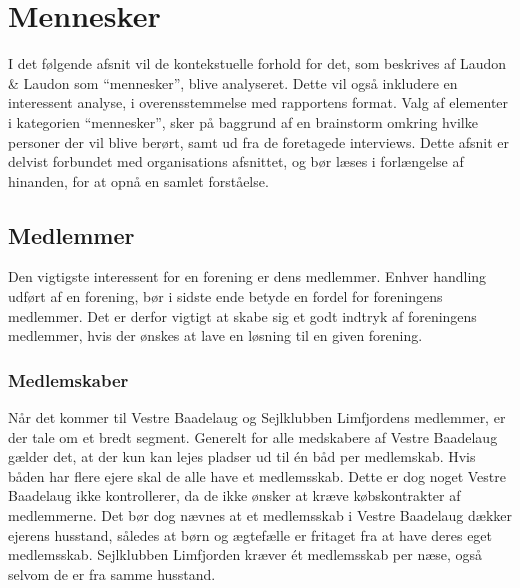 







\section{Mennesker}

I det følgende afsnit vil de kontekstuelle forhold for det, som beskrives af Laudon \& Laudon som \enquote{mennesker}, blive analyseret. Dette vil også inkludere en interessent analyse, i overensstemmelse med rapportens format. Valg af elementer i kategorien \enquote{mennesker}, sker på baggrund af en brainstorm omkring hvilke personer der vil blive berørt, samt ud fra de foretagede interviews. Dette afsnit er delvist forbundet med organisations afsnittet, og bør læses i forlængelse af hinanden, for at opnå en samlet forståelse.

\subsection{Medlemmer}

Den vigtigste interessent for en forening er dens medlemmer. Enhver handling udført af en forening, bør i sidste ende betyde en fordel for foreningens medlemmer. Det er derfor vigtigt at skabe sig et godt indtryk af foreningens medlemmer, hvis der ønskes at lave en løsning til en given forening.


\subsubsection{Medlemskaber}

Når det kommer til Vestre Baadelaug og Sejlklubben Limfjordens medlemmer, er der tale om et bredt segment. Generelt for alle medskabere af Vestre Baadelaug gælder det, at der kun kan lejes pladser ud til én båd per medlemskab. Hvis båden har flere ejere skal de alle have et medlemsskab. Dette er dog noget Vestre Baadelaug ikke kontrollerer, da de ikke ønsker at kræve købskontrakter af medlemmerne. Det bør dog nævnes at et medlemsskab i Vestre Baadelaug dækker ejerens husstand, således at børn og ægtefælle er fritaget fra at have deres eget medlemsskab. Sejlklubben Limfjorden kræver ét medlemsskab per næse, også selvom de er fra samme husstand.

